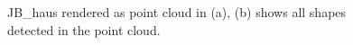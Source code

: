 \begin{figure}
\centering
{}
\caption[Rendering of JB\_haus in (a), rendering of the detected shapes in (b)]
{JB\_haus rendered as point cloud in (a), (b) shows all shapes detected in the point cloud. }
\label{fig:JB_haus_results}
\end{figure}

